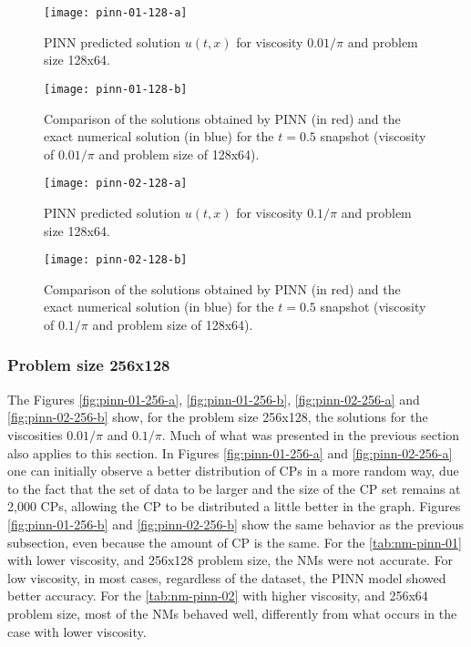 \documentclass[conference]{IEEEtran}
\begin{document}
\begin{figure}[htb]\centering
\texttt{[image: pinn-01-128-a]}
\caption{PINN predicted solution $u(t, x)$ for viscosity ${0.01}/{\pi}$ and problem size 128x64.}
\label{fig:pinn-01-128-a}
\end{figure}

\begin{figure}[htb]\centering
\texttt{[image: pinn-01-128-b]}
\caption{Comparison of the solutions obtained by PINN (in red) and the exact numerical solution (in blue) for the $t=0.5$ snapshot (viscosity of ${0.01}/{\pi}$ and problem size of 128x64).}
\label{fig:pinn-01-128-b}
\end{figure}

\begin{figure}[htb]\centering
\texttt{[image: pinn-02-128-a]}
\caption{PINN predicted solution $u(t, x)$ for viscosity ${0.1}/{\pi}$ and problem size 128x64.}
\label{fig:pinn-02-128-a}
\end{figure}

\begin{figure}[htb]\centering
\texttt{[image: pinn-02-128-b]}
\caption{Comparison of the solutions obtained by PINN (in red) and the exact numerical solution (in blue) for the $t=0.5$ snapshot (viscosity of ${0.1}/{\pi}$ and problem size of 128x64).}
\label{fig:pinn-02-128-b}
\end{figure}

\subsubsection{Problem size 256x128}

The Figures \ref{fig:pinn-01-256-a}, \ref{fig:pinn-01-256-b}, \ref{fig:pinn-02-256-a} and \ref{fig:pinn-02-256-b} show, for the problem size 256x128, the solutions for the viscosities ${0.01}/{\pi}$ and ${0.1}/{\pi}$. 
Much of what was presented in the previous section also applies to this section.
In Figures \ref{fig:pinn-01-256-a} and \ref{fig:pinn-02-256-a} one can initially observe a better distribution of CPs in a more random way, due to the fact that the set of data to be larger and the size of the CP set remains at 2,000 CPs, allowing the CP to be distributed a little better in the graph.
Figures \ref{fig:pinn-01-256-b} and \ref{fig:pinn-02-256-b} show the same behavior as the previous subsection, even because the amount of CP is the same. 
For the \autoref{tab:nm-pinn-01} with lower viscosity, and 256x128 problem size, the NMs were not accurate. For low viscosity, in most cases, regardless of the dataset, the PINN model showed better accuracy. For the \autoref{tab:nm-pinn-02} with higher viscosity, and 256x64 problem size, most of the NMs behaved well, differently from what occurs in the case with lower viscosity.
\end{document}
